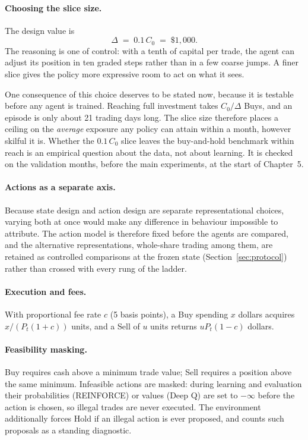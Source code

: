 \paragraph{Choosing the slice size.} The design value is
\[
\Delta \;=\; 0.1\,C_0 \;=\; \$1{,}000 .
\]
The reasoning is one of control: with a tenth of capital per trade, the
agent can adjust its position in ten graded steps rather than in a few
coarse jumps. A finer slice gives the policy more expressive room to act
on what it sees.

One consequence of this choice deserves to be stated now, because it is
testable before any agent is trained. Reaching full investment takes
$C_0/\Delta$ Buys, and an episode is only about 21 trading days long. The
slice size therefore places a ceiling on the \emph{average} exposure any
policy can attain within a month, however skilful it is. Whether the
$0.1\,C_0$ slice leaves the buy-and-hold benchmark within reach is an
empirical question about the data, not about learning. It is checked on
the validation months, before the main experiments, at the start of
Chapter~5.

\paragraph{Actions as a separate axis.} Because state design and action
design are separate representational choices, varying both at once would
make any difference in behaviour impossible to attribute. The action model
is therefore fixed before the agents are compared, and the alternative
representations, whole-share trading among them, are retained as
controlled comparisons at the frozen state (Section~\ref{sec:protocol})
rather than crossed with every rung of the ladder.

\paragraph{Execution and fees.} With proportional fee rate $c$ (5 basis
points), a Buy spending $x$ dollars acquires $x / (P_t(1+c))$ units, and a
Sell of $u$ units returns $u P_t (1-c)$ dollars.

\paragraph{Feasibility masking.} Buy requires cash above a minimum trade
value; Sell requires a position above the same minimum. Infeasible actions
are masked: during learning and evaluation their probabilities (REINFORCE)
or values (Deep Q) are set to $-\infty$ before the action is chosen, so
illegal trades are never executed. The environment additionally forces
Hold if an illegal action is ever proposed, and counts such proposals as a
standing diagnostic.

